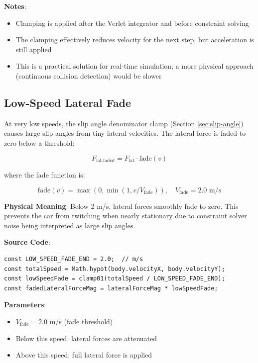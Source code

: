 \textbf{Notes}:
\begin{itemize}
  \item Clamping is applied after the Verlet integrator and before constraint solving
  \item The clamping effectively reduces velocity for the next step, but acceleration is still applied
  \item This is a practical solution for real-time simulation; a more physical approach (continuous collision detection) would be slower
\end{itemize}

\subsection{Low-Speed Lateral Fade}

At very low speeds, the slip angle denominator clamp (Section \ref{sec:slip-angle}) causes large slip angles from tiny lateral velocities. The lateral force is faded to zero below a threshold:

\begin{equation}
  F_{\text{lat,faded}} = F_{\text{lat}} \cdot \text{fade}(v)
  \label{eq:lateral-fade}
\end{equation}

where the fade function is:

\begin{equation}
  \text{fade}(v) = \max(0, \min(1, v / V_{\text{fade}})), \quad V_{\text{fade}} = 2.0 \text{ m/s}
  \label{eq:fade-function}
\end{equation}

\textbf{Physical Meaning}: Below 2 m/s, lateral forces smoothly fade to zero. This prevents the car from twitching when nearly stationary due to constraint solver noise being interpreted as large slip angles.

\textbf{Source Code}: 

\begin{lstlisting}[caption={Low-speed lateral force fade}]
const LOW_SPEED_FADE_END = 2.0;  // m/s
const totalSpeed = Math.hypot(body.velocityX, body.velocityY);
const lowSpeedFade = clamp01(totalSpeed / LOW_SPEED_FADE_END);
const fadedLateralForceMag = lateralForceMag * lowSpeedFade;
\end{lstlisting}

\textbf{Parameters}:
\begin{itemize}
  \item $V_{\text{fade}} = 2.0$ m/s (fade threshold)
  \item Below this speed: lateral forces are attenuated
  \item Above this speed: full lateral force is applied
\end{itemize}

